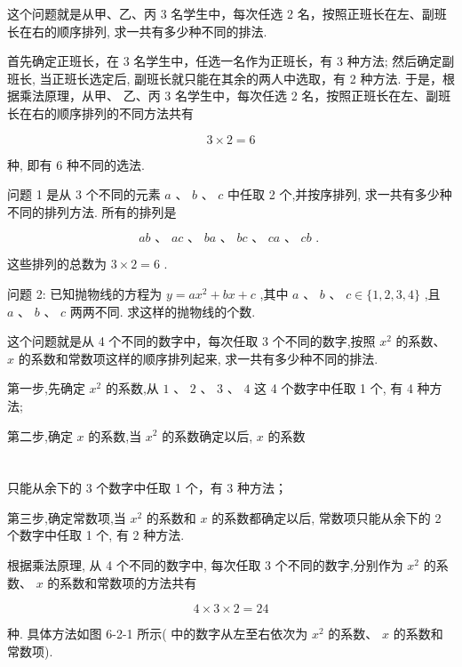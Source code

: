 \documentclass[10pt]{article}
\begin{document}
这个问题就是从甲、乙、丙 3 名学生中，每次任选 2 名，按照正班长在左、副班长在右的顺序排列, 求一共有多少种不同的排法.

首先确定正班长，在 3 名学生中，任选一名作为正班长，有 3 种方法; 然后确定副班长, 当正班长选定后, 副班长就只能在其余的两人中选取，有 2 种方法. 于是，根据乘法原理，从甲、 乙、丙 3 名学生中，每次任选 2 名，按照正班长在左、副班长在右的顺序排列的不同方法共有

\[
3 \times  2 = 6
\]

种, 即有 6 种不同的选法.

问题 1 是从 3 个不同的元素 \(a\text{ 、 }b\text{ 、 }c\) 中任取 2 个,并按序排列, 求一共有多少种不同的排列方法. 所有的排列是

\[
{ab}\text{ 、 }{ac}\text{ 、 }{ba}\text{ 、 }{bc}\text{ 、 }{ca}\text{ 、 }{cb}\text{ . }
\]

这些排列的总数为 \(3 \times  2 = 6\) .

问题 2: 已知抛物线的方程为 \(y = a{x}^{2} + {bx} + c\) ,其中 \(a\text{ 、 }b\) 、 \(c \in  \{ 1,2,3,4\}\) ,且 \(a\text{ 、 }b\text{ 、 }c\) 两两不同. 求这样的抛物线的个数.

这个问题就是从 4 个不同的数字中，每次任取 3 个不同的数字,按照 \({x}^{2}\) 的系数、 \(x\) 的系数和常数项这样的顺序排列起来, 求一共有多少种不同的排法.

第一步,先确定 \({x}^{2}\) 的系数,从 \(1\text{ 、 }2\text{ 、 }3\text{ 、 }4\) 这 4 个数字中任取 1 个, 有 4 种方法;

第二步,确定 \(x\) 的系数,当 \({x}^{2}\) 的系数确定以后, \(x\) 的系数

\section*{}

\section*{}

只能从余下的 3 个数字中任取 1 个，有 3 种方法；

第三步,确定常数项,当 \({x}^{2}\) 的系数和 \(x\) 的系数都确定以后, 常数项只能从余下的 2 个数字中任取 1 个, 有 2 种方法.

根据乘法原理, 从 4 个不同的数字中, 每次任取 3 个不同的数字,分别作为 \({x}^{2}\) 的系数、 \(x\) 的系数和常数项的方法共有

\[
4 \times  3 \times  2 = {24}
\]

种. 具体方法如图 6-2-1 所示(  \Square  \Square   \Square  中的数字从左至右依次为 \({x}^{2}\) 的系数、 \(x\) 的系数和常数项).
\end{document}

